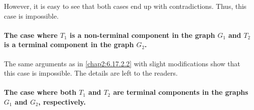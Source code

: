 However, it is easy to see that both cases end up with
contradictions. Thus, this case is impossible.

\paragraph{The case where $T_{1}$ is a non-terminal component in
  the graph $G_{1}$ and $T_{2}$ is a terminal component in the graph
  $G_{2}$.}\label{chap2:6.17.2.3} 

The same arguments as in \ref{chap2:6.17.2.2} with slight modifications show
that this case is impossible. The details are left to the readers.

\paragraph{The case where both $T_{1}$ and $T_{2}$ are terminal
  components in the graphs $G_{1}$ and $G_{2}$,
  respectively.}\label{chap2:6.17.2.4}

